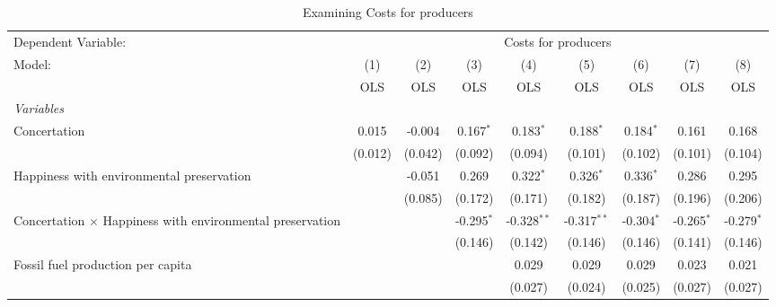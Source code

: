 
\begin{table}[htbp]
   \caption{Examining Costs for producers}
   \centering
   \begin{tabular}{lcccccccc}
      \toprule
      Dependent Variable: & \multicolumn{8}{c}{Costs for producers}\\
      Model:                                                           & (1)     & (2)     & (3)          & (4)           & (5)           & (6)          & (7)           & (8)\\  
                                                                       &  OLS    & OLS     & OLS          & OLS           & OLS           & OLS          & OLS           & OLS\\  
      \midrule
      \emph{Variables}\\
      Concertation                                                     & 0.015   & -0.004  & 0.167$^{*}$  & 0.183$^{*}$   & 0.188$^{*}$   & 0.184$^{*}$  & 0.161         & 0.168\\   
                                                                       & (0.012) & (0.042) & (0.092)      & (0.094)       & (0.101)       & (0.102)      & (0.101)       & (0.104)\\   
      Happiness with environmental preservation                        &         & -0.051  & 0.269        & 0.322$^{*}$   & 0.326$^{*}$   & 0.336$^{*}$  & 0.286         & 0.295\\   
                                                                       &         & (0.085) & (0.172)      & (0.171)       & (0.182)       & (0.187)      & (0.196)       & (0.206)\\   
      Concertation $\times$ Happiness with environmental preservation  &         &         & -0.295$^{*}$ & -0.328$^{**}$ & -0.317$^{**}$ & -0.304$^{*}$ & -0.265$^{*}$  & -0.279$^{*}$\\   
                                                                       &         &         & (0.146)      & (0.142)       & (0.146)       & (0.146)      & (0.141)       & (0.146)\\   
      Fossil fuel production per capita                                &         &         &              & 0.029         & 0.029         & 0.029        & 0.023         & 0.021\\   
                                                                       &         &         &              & (0.027)       & (0.024)       & (0.025)      & (0.027)       & (0.027)\\   

\end{tabular}
\end{table}
